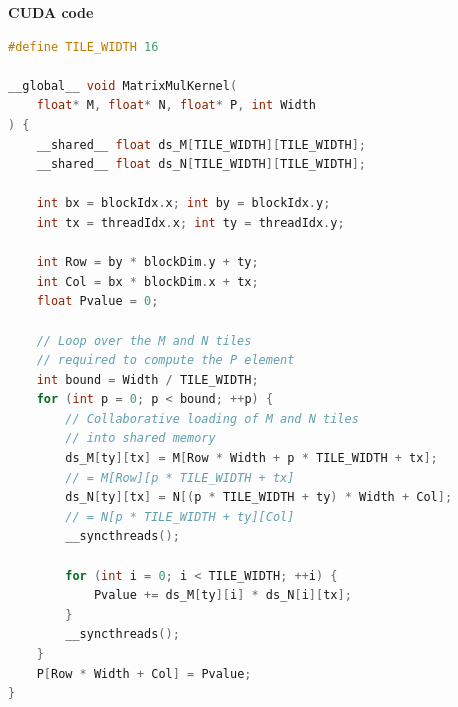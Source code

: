 \highspace
\begin{flushleft}
    \textcolor{Green3}{ \textbf{CUDA code}}
\end{flushleft}
\begin{lstlisting}[language=C++]
#define TILE_WIDTH 16

__global__ void MatrixMulKernel(
    float* M, float* N, float* P, int Width
) {
    __shared__ float ds_M[TILE_WIDTH][TILE_WIDTH];
    __shared__ float ds_N[TILE_WIDTH][TILE_WIDTH];

    int bx = blockIdx.x; int by = blockIdx.y;
    int tx = threadIdx.x; int ty = threadIdx.y;

    int Row = by * blockDim.y + ty;
    int Col = bx * blockDim.x + tx;
    float Pvalue = 0;

    // Loop over the M and N tiles 
    // required to compute the P element
    int bound = Width / TILE_WIDTH;
    for (int p = 0; p < bound; ++p) {
        // Collaborative loading of M and N tiles
        // into shared memory
        ds_M[ty][tx] = M[Row * Width + p * TILE_WIDTH + tx];
        // = M[Row][p * TILE_WIDTH + tx]
        ds_N[ty][tx] = N[(p * TILE_WIDTH + ty) * Width + Col];
        // = N[p * TILE_WIDTH + ty][Col]
        __syncthreads();

        for (int i = 0; i < TILE_WIDTH; ++i) {
            Pvalue += ds_M[ty][i] * ds_N[i][tx];
        }
        __syncthreads();
    }
    P[Row * Width + Col] = Pvalue;
}
\end{lstlisting}
